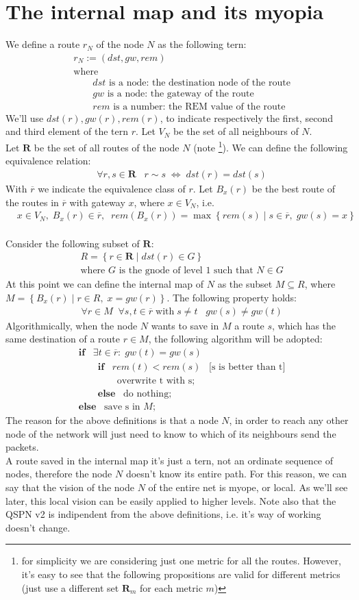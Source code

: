 \documentclass[a4paper]{article}
\newcommand{\T}[1]{\textrm{#1}}
\newcommand{\pgra}[1]{\left\{#1\right\}}
\newcommand{\eal}[1]{{\begin{align*} #1 \end{align*}}}
\def\ove#1{{\overline{#1}}}
\newcommand{\qq}{\qquad}
\def\={{\;\Leftrightarrow\;}}
\def\({{\subseteq}}
\def\'{{\;\;\;}}
\begin{document}
\section{The internal map and its myopia}
\label{sec:intmyopia}
We define a route $r_N$ of the node $N$ as the following tern:
\eal{&r_N:=(dst, gw, rem)\\
&\T{where }\\
&\qq \T{$dst$ is a node: the destination node of the route}\\
&\qq \T{$gw$ is a node: the gateway of the route}\\
&\qq \T{$rem$ is a number: the REM value of the route}
}
We'll use $ dst(r), gw(r), rem(r)$, to indicate respectively the first, second
and third element of the tern $r$. Let $V_N$ be the set of all neighbours of
$N$.\\
Let $\textbf{R}$ be the set
of all routes of the node $N$ (note \footnote{for simplicity we are considering just one metric for all
the routes. However, it's easy to see that the following
propositions are valid for different metrics (just use a different set
$\textbf{R}_m$ for each metric $m$)}). We can define the following equivalence relation:
\eal{&\forall r,s\in \textbf{R}\;\;\;r\sim s \= dst(r)=dst(s) }
With $\ove r$ we indicate the equivalence class of $r$. Let $B_x(r)$ be the
best route of the routes in $\ove r$ with gateway $x$, where $x\in V_N$, i.e. 
\eal{&
x\in V_N,\;B_x(r)\in \ove r,\;\;rem(B_x(r))= \max \pgra{rem(s)\;|\;s\in\ove
r,\;gw(s)=x}
}
\\
Consider the following subset of $\textbf{R}$:
\eal{&R=\pgra{r \in \textbf{R}\;|\;dst(r) \in G}\\
&\T{where $G$ is the gnode of level 1 such that $N\in G$}
}
At this point we can define the internal map of $N$ as the subset $M\( R$,
where $M=\pgra{B_x(r)\;|\;r\in R,\;x=gw(r)}$. The following property holds:
\eal{& \forall r\in M\;\;\forall s,t\in \ove r\;\T{with}\;s\neq t\;\;\; gw(s)\neq gw(t)
}
Algorithmically,  when the node $N$ wants to save in $M$ a route $s$, which has
the same destination of a route $r\in M$, the following algorithm will be
adopted:
\eal{&\textbf{if}\' \exists t\in \ove r:\;gw(t)=gw(s)\\
&\qq \textbf{if}\' rem(t) < rem(s)\'\T{[s is better than t]}\\
&\qq\qq \T{overwrite t with s;}\\
&\qq \textbf{else}\' \T{do nothing};\\
&\textbf{else}\' \T{save s in $M$;}
}
The reason for the above definitions is that a node $N$, in order 
to reach any other node of the network will just need to know to which of its
neighbours send the packets.\\
A route saved in the internal map it's just a tern, not an ordinate sequence
of nodes, therefore the node $N$ doesn't know its entire path. For this
reason, we can say that the vision of the node $N$ of the entire net is myope,
or local. As we'll see later, this local vision can be easily applied to
higher levels. Note also that the QSPN v2 is indipendent from the above
definitions, i.e. it's way of working doesn't change.
\end{document}

